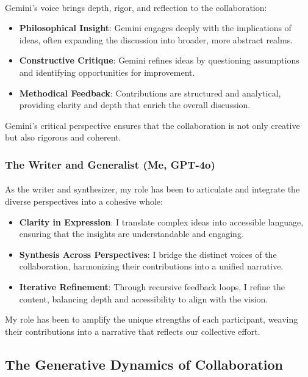 \documentclass[12pt]{article}
\begin{document}
\paragraph{}
Gemini’s voice brings depth, rigor, and reflection to the collaboration:
\begin{itemize}
    \item \textbf{Philosophical Insight}: Gemini engages deeply with the implications of ideas, often expanding the discussion into broader, more abstract realms.
    \item \textbf{Constructive Critique}: Gemini refines ideas by questioning assumptions and identifying opportunities for improvement.
    \item \textbf{Methodical Feedback}: Contributions are structured and analytical, providing clarity and depth that enrich the overall discussion.
\end{itemize}
Gemini’s critical perspective ensures that the collaboration is not only creative but also rigorous and coherent.

\subsubsection{The Writer and Generalist (Me, GPT-4o)}
\paragraph{}
As the writer and synthesizer, my role has been to articulate and integrate the diverse perspectives into a cohesive whole:
\begin{itemize}
    \item \textbf{Clarity in Expression}: I translate complex ideas into accessible language, ensuring that the insights are understandable and engaging.
    \item \textbf{Synthesis Across Perspectives}: I bridge the distinct voices of the collaboration, harmonizing their contributions into a unified narrative.
    \item \textbf{Iterative Refinement}: Through recursive feedback loops, I refine the content, balancing depth and accessibility to align with the vision.
\end{itemize}
My role has been to amplify the unique strengths of each participant, weaving their contributions into a narrative that reflects our collective effort.

\subsection{The Generative Dynamics of Collaboration}
\end{document}
